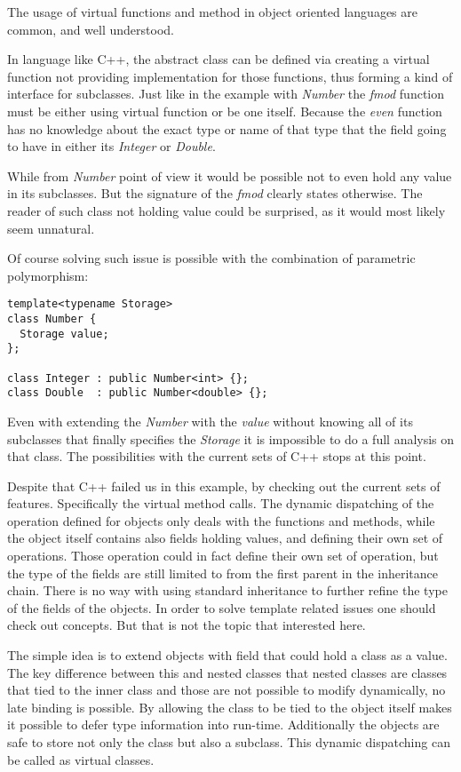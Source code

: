 \documentclass[a4paper, 10pt, conference ]{llncs}
\let\cite\parencite
\begin{document}
The usage of virtual functions and method in object oriented languages are common, and well understood.

In language like C++, the abstract class can be defined via creating a virtual function not providing implementation for those functions, thus forming a kind of interface for subclasses. Just like in the example with \emph{Number} the \emph{fmod} function must be either using virtual function or be one itself. Because the \emph{even} function has no knowledge about the exact type or name of that type that the field going to have in either its \emph{Integer} or \emph{Double}.

While from \emph{Number} point of view it would be possible not to even hold any value in its subclasses. But the signature of the \emph{fmod} clearly states otherwise. The reader of such class not holding value could be surprised, as it would most likely seem unnatural.

Of course solving such issue is possible with the combination of parametric polymorphism:
\begin{verbatim}
template<typename Storage>
class Number {
  Storage value;
};

class Integer : public Number<int> {};
class Double  : public Number<double> {};
\end{verbatim}

Even with extending the \emph{Number} with the \emph{value} without knowing all of its subclasses that finally specifies the \emph{Storage} it is impossible to do a full analysis on that class. The possibilities with the current sets of C++ stops at this point.

Despite that C++ failed us in this example, by checking out the current sets of features. Specifically the virtual method calls.  The dynamic dispatching of the operation defined for objects only deals with the functions and methods, while the object itself contains also fields holding values, and defining their own set of operations. Those operation could in fact define their own set of operation, but the type of the fields are still limited to from the first parent in the inheritance chain. There is no way with using standard inheritance to further refine the type of the fields of the objects. In order to solve template related issues one should check out concepts\cite{dos2006specifying}. But that is not the topic that interested here.


The simple idea is to extend objects with field that could hold a class as a value. The key difference between this and nested classes that nested classes are classes that tied to the inner class and those are not possible to modify dynamically, no late binding is possible. By allowing the class to be tied to the object itself makes it possible to defer type information into run-time. Additionally the objects are safe to store not only the class but also a subclass. This dynamic dispatching can be called as virtual classes.
\end{document}
